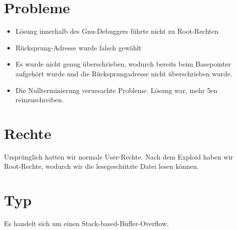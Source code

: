 \section{Probleme}
\begin{itemize}
    \item Lösung innerhalb des Gnu-Debuggers führte nicht zu Root-Rechten
    \item Rücksprung-Adresse wurde falsch gewählt
    \item Es wurde nicht genug überschrieben, wodurch bereits beim Basepointer aufgehört wurde und die Rücksprungadresse nicht überschrieben wurde.
    \item Die Nullterminierung verursachte Probleme. Lösung war, mehr 5en reinzuschreiben.
\end{itemize}

\section{Rechte}
Ursprünglich hatten wir normale User-Rechte. Nach dem Exploid haben wir Root-Rechte, wodurch wir die lesegeschützte Datei lesen können.


\section{Typ}
Es handelt sich um einen Stack-based-Buffer-Overflow.
